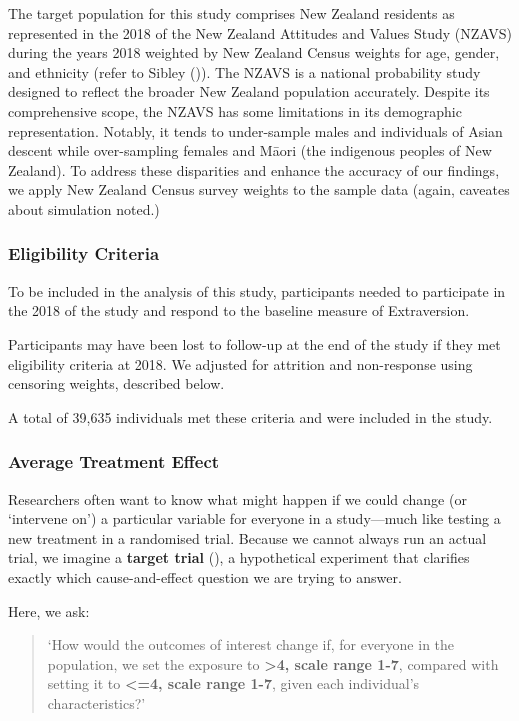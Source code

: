 \documentclass[
  single column]{article}
\begin{document}
The target population for this study comprises New Zealand residents as
represented in the 2018 of the New Zealand Attitudes and Values Study
(NZAVS) during the years 2018 weighted by New Zealand Census weights for
age, gender, and ethnicity (refer to Sibley
()). The NZAVS is a national probability
study designed to reflect the broader New Zealand population accurately.
Despite its comprehensive scope, the NZAVS has some limitations in its
demographic representation. Notably, it tends to under-sample males and
individuals of Asian descent while over-sampling females and Māori (the
indigenous peoples of New Zealand). To address these disparities and
enhance the accuracy of our findings, we apply New Zealand Census survey
weights to the sample data (again, caveates about simulation noted.)

\subsubsection{Eligibility Criteria}\label{eligibility-criteria}

To be included in the analysis of this study, participants needed to
participate in the 2018 of the study and respond to the baseline measure
of Extraversion.

Participants may have been lost to follow-up at the end of the study if
they met eligibility criteria at 2018. We adjusted for attrition and
non-response using censoring weights, described below.

A total of 39,635 individuals met these criteria and were included in
the study.

\subsubsection{Average Treatment Effect}\label{average-treatment-effect}

Researchers often want to know what might happen if we could change (or
`intervene on') a particular variable for everyone in a study---much
like testing a new treatment in a randomised trial. Because we cannot
always run an actual trial, we imagine a \textbf{target trial}
(), a hypothetical
experiment that clarifies exactly which cause-and-effect question we are
trying to answer.

Here, we ask:

\begin{quote}
`How would the outcomes of interest change if, for everyone in the
population, we set the exposure to \textbf{\textgreater4, scale range
1-7}, compared with setting it to \textbf{\textless=4, scale range 1-7},
given each individual's characteristics?'
\end{quote}
\end{document}
